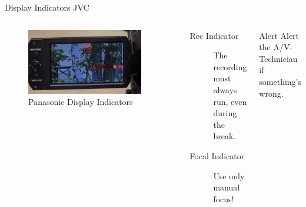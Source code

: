 \documentclass[aspectratio=169]{beamer}
\begin{document}
\begin{frame}{Display Indicators JVC}
	\begin{columns}[T,onlytextwidth]
	\begin{figure} 
		\centering
		\includegraphics[width=0.9\textwidth]{images/jvc_display_description.png}
		\caption{Panasonic Display Indicators}
	\end{figure}
		\begin{description}
			\item[Rec Indicator] The recording must always run, even during the break.
			\item[Focal Indicator] Use only manual focus!
		\end{description}
		\begin{alertblock}{Alert}
			Alert the A/V-Technician if something's wrong.
		\end{alertblock}
	\end{columns}
\end{frame}


%
\end{document}

